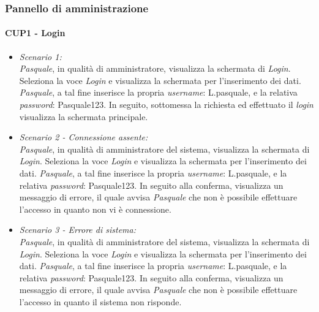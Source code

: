 \subsubsection{Pannello di amministrazione}
\paragraph{CUP1 - Login \\}
\begin{itemize}
	
	\item \textit{Scenario 1:\\}
	\textit{Pasquale}, in qualità di amministratore, visualizza la schermata di \textit{Login}. Seleziona la voce \textit{Login} e visualizza la schermata per l’inserimento dei dati. \textit{Pasquale}, a tal fine inserisce la propria \textit{username}: L.pasquale, e la relativa \textit{password}: Pasquale123. In seguito, sottomessa la richiesta ed effettuato il \textit{login} visualizza la schermata principale.\\
	
	\item \textit{Scenario 2 - Connessione assente:\\}
	\textit{Pasquale}, in qualità di amministratore del sistema, visualizza la schermata di \textit{Login}. Seleziona la voce \textit{Login} e visualizza la schermata per l’inserimento dei dati. \textit{Pasquale}, a tal fine inserisce la propria \textit{username}: L.pasquale, e la relativa \textit{password}: Pasquale123. In seguito alla conferma, visualizza un messaggio di errore, il quale avvisa \textit{Pasquale} che non è possibile effettuare l’accesso in quanto non vi è connessione.\\
	
	\item \textit{Scenario 3 - Errore di sistema:\\}
	\textit{Pasquale}, in qualità di amministratore del sistema, visualizza la schermata di \textit{Login}. Seleziona la voce \textit{Login} e visualizza la schermata per l’inserimento dei dati. \textit{Pasquale}, a tal fine inserisce la propria \textit{username}: L.pasquale, e la relativa \textit{password}: Pasquale123. In seguito alla conferma, visualizza un messaggio di errore, il quale avvisa \textit{Pasquale} che non è possibile effettuare l’accesso in quanto il sistema non risponde.\\
	

\end{itemize}
